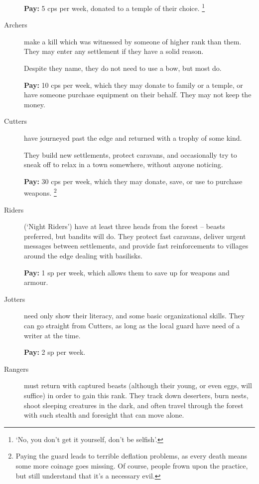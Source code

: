 \begin{multicols}{2}
\begin{description}
  \textbf{Pay:} 5 \glspl{cp} per week, donated to a temple of their choice.%
  \footnote{`No, you don't get it yourself, don't be selfish'.}

  \item[Archers]
  make a kill which was witnessed by someone of higher rank than them.
  They may enter any settlement if they have a solid reason.

  Despite they name, they do not need to use a bow, but most do.

  \textbf{Pay:} 10 \glspl{cp} per week, which they may donate to family or a temple, or have someone purchase equipment on their behalf.
  They may not keep the money.

  \item[Cutters]
  have journeyed past the \gls{edge} and returned with a trophy of some kind.

  They build new settlements, protect caravans, and occasionally try to sneak off to relax in a town somewhere, without anyone noticing.

  \textbf{Pay:} 30 \glspl{cp} per week, which they may donate, save, or use to purchase weapons.%
  \footnote{Paying the \gls{guard} leads to terrible deflation problems, as every death means some more coinage goes missing.
  Of course, people frown upon the practice, but still understand that it's a necessary evil.}

  \item[Riders]
  (`Night Riders')
  have at least three heads from the forest -- beasts preferred, but bandits will do.
  They protect fast caravans, deliver urgent messages between settlements, and provide fast reinforcements to villages around the \gls{edge} dealing with basilisks.

  \textbf{Pay:} 1 \gls{sp} per week, which allows them to save up for weapons and armour.

  \item[Jotters]
  need only show their literacy, and some basic organizational skills.
  They can go straight from Cutters, as long as the local \gls{guard} have need of a writer at the time.

  \textbf{Pay:} 2 \gls{sp} per week.

  \item[Rangers]
  must return with captured beasts (although their young, or even eggs, will suffice) in order to gain this rank.
  They track down deserters, burn nests, shoot sleeping creatures in the dark, and often travel through the forest with such stealth and foresight that can move alone.
  

\end{description}
\end{multicols}
